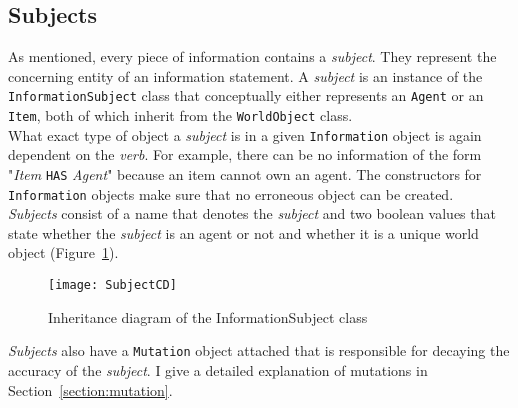 \subsection{Subjects}
As mentioned, every piece of information contains a \textit{subject}. They represent the concerning entity of an information statement. A \textit{subject} is an instance of the \verb|InformationSubject| class that conceptually either represents an \verb|Agent| or an \verb|Item|, both of which inherit from the \verb|WorldObject| class.\\
What exact type of object a \textit{subject} is in a given \verb|Information| object is again dependent on the \textit{verb}. For example, there can be no information of the form "\textit{Item} \verb|HAS| \textit{Agent}" because an item cannot own an agent. The constructors for \verb|Information| objects make sure that no erroneous object can be created.\\
\textit{Subjects} consist  of a name that denotes the \textit{subject} and two boolean values that state whether the \textit{subject} is an agent or not and whether it is a unique world object (Figure~\ref{fig:subjectCD}).
\begin{figure}
	\centering
	\texttt{[image: SubjectCD]}
	\caption{Inheritance diagram of the InformationSubject class}
	\label{fig:subjectCD}
\end{figure}
\textit{Subjects} also have a \verb|Mutation| object attached that is responsible for decaying the accuracy of the \textit{subject}. I give a detailed explanation of mutations in Section~\ref{section:mutation}.
